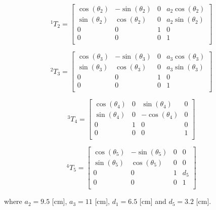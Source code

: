 \documentclass{article}
\renewcommand{\c}[1]{\cos(\theta_{#1})}
\newcommand{\s}[1]{\sin(\theta_{#1})}
\newcommand{\T}[2]{{}^{#1}T_{#2}}
\begin{document}
\begin{equation}
\label{eq:forward.t_12}
\T{1}{2} =\left[
\begin{array}{cccc}
	\c{2} & -\s{2} & 0 & a_2\c{2} \\
	\s{2} & \c{2} & 0 & a_2\s{2}  \\
	0 & 0 & 1 & 0 \\
	0 & 0 & 0 & 1 \\
\end{array}
\right]
\end{equation}

\begin{equation}
\label{eq:forward.t_23}
\T{2}{3} =\left[
\begin{array}{cccc}
	\c{3} & -\s{3} & 0 & a_3\c{3} \\
	\s{3} & \c{3} & 0 & a_3\s{3}  \\
	0 & 0 & 1 & 0 \\
	0 & 0 & 0 & 1 \\
\end{array}
\right]
\end{equation}

\begin{equation}
\label{eq:forward.t_34}
\T{3}{4} = \left[
\begin{array}{cccc}
	\c{4} & 0 & \s{4} & 0 \\
	\s{4} & 0 & -\c{4} & 0 \\
	0 & 1 & 0 & 0 \\
	0 & 0 & 0 & 1 \\
\end{array}
\right]
\end{equation}

\begin{equation}
\label{eq:forward.t_45}
\T{4}{5} =\left[
\begin{array}{cccc}
	\c{5} & -\s{5} & 0 & 0 \\
	\s{5} & \c{5} & 0 & 0  \\
	0 & 0 & 1 & d_5\\
	0 & 0 & 0 & 1 \\
\end{array}
\right]
\end{equation}

where $a_2 = 9.5$ [cm], $a_3 = 11$ [cm], $d_1 = 6.5$ [cm] and $d_5 = 3.2$ [cm].
\end{document}
